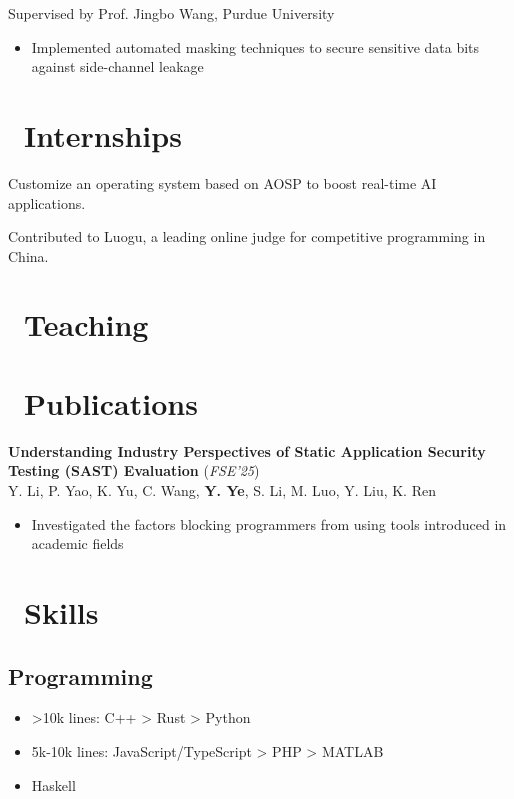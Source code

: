 \documentclass{resume}
\begin{document}
Supervised by Prof. Jingbo Wang, Purdue University
\begin{itemize}[itemsep=0.5ex]  
  \item Implemented automated masking techniques to secure sensitive data bits against side-channel leakage  
\end{itemize}

\section{\faUsers\ Internships}
Customize an operating system based on AOSP to boost real-time AI applications.

Contributed to Luogu, a leading online judge for competitive programming in China.

\section{\faBook\ Teaching}

\section{\faBookmarkO\ Publications}

\textbf{Understanding Industry Perspectives of Static Application Security Testing (SAST) Evaluation} (\textit{FSE'25})\\
Y. Li, P. Yao, K. Yu, C. Wang, \textbf{Y. Ye}, S. Li, M. Luo, Y. Liu, K. Ren
\begin{itemize}[itemsep=0.5ex]
  \item Investigated the factors blocking programmers from using tools introduced in academic fields
\end{itemize}


\section{\faCogs\ Skills}
\subsection{\textbf{Programming}}
\begin{itemize}[itemsep=0.5ex]
  \item >10k lines: C++ > Rust > Python
  \item 5k-10k lines: JavaScript/TypeScript > PHP > MATLAB
  \item <5k lines: Java > Haskell
\end{itemize}
\end{document}
